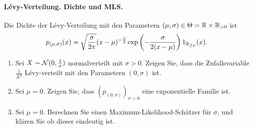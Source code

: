 \paragraph{L\'evy-Verteilung. Dichte und MLS.} Die Dichte der L\'evy-Verteilung mit den
Parametern $(\mu,\sigma)\in \Theta = \mathbb R \times \mathbb R_{>0}$ ist
\begin{equation*}
    p_{(\mu, \sigma)}(x) = \sqrt{ \frac{\sigma}{2\pi}} (x-\mu)^{-\frac{3}{2}} 
    \exp\left( -\frac{\sigma}{2(x-\mu)} \right) 1_{\mathbb R_{\geq \mu}} (x).
\end{equation*}
\begin{enumerate}
    \item Sei $X\sim \mathcal N (0, \frac{1}{\sigma})$ normalverteilt mit $\sigma>0$.
        Zeigen Sie, dass die Zufallsvariable $\frac{1}{X^2}$ L\'evy-verteilt mit den Parametern
        $(0,\sigma)$ ist.
    \item Sei $\mu=0$. Zeigen Sie, dass $(p_{(0,\sigma)})_{\sigma>0}$ eine
        exponentielle Familie ist. 
    \item Sei $\mu=0$. Berechnen Sie einen Maximum-Likelihood-Schätzer für $\sigma$, und
        klären Sie ob dieser eindeutig ist.
\end{enumerate}

